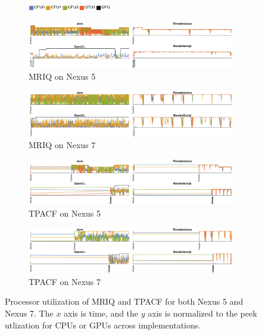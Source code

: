 \begin{figure}[t]
  \centering

  \begin{subfigure}[b]{\textwidth}
          \centering
          \includegraphics[width=0.4\textwidth]{data/load_legend.pdf}
  \end{subfigure}

  \begin{subfigure}[b]{0.95\textwidth}
      \centering
      \includegraphics[width=\textwidth]{data/load_mriq_nexus5.pdf}
      \caption{MRIQ on Nexus 5}
      \label{fig:MRIQ5}
  \end{subfigure}
  \begin{subfigure}[b]{0.95\textwidth}
      \centering
      \includegraphics[width=\textwidth]{data/load_mriq_nexus7.pdf}
      \caption{MRIQ on Nexus 7}
      \label{fig:MRIQ7}
  \end{subfigure}

  \begin{subfigure}[b]{0.95\textwidth}
      \centering
      \includegraphics[width=\textwidth]{data/load_tpacf_nexus5.pdf}
      \caption{TPACF on Nexus 5}
      \label{fig:TPACF5}
  \end{subfigure}
  \begin{subfigure}[b]{0.95\textwidth}
      \centering
      \includegraphics[width=\textwidth]{data/load_tpacf_nexus7.pdf}
      \caption{TPACF on Nexus 7}
      \label{fig:TPACF7}
  \end{subfigure}

  \caption{Processor utilization of MRIQ and TPACF for both Nexus 5 and Nexus 7. The $x$ axis is time, and the $y$ axis is normalized to the peek utlization for CPUs or GPUs across implementations.}
  \label{fig:loadMRIQTpacf}
\end{figure}
\FloatBarrier

